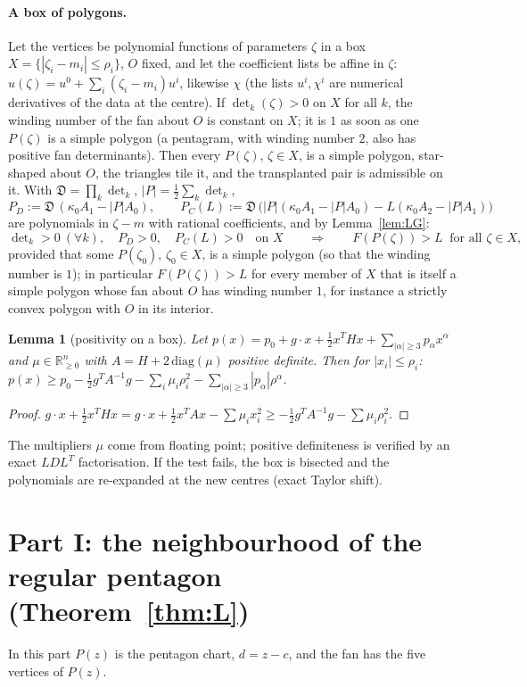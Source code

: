 \documentclass[11pt]{article}
\newtheorem{lemma}[theorem]{Lemma}
\theoremstyle{remark}
\newcommand{\R}{\mathbb{R}}
\newcommand{\D}{\mathfrak{D}}
\begin{document}
\paragraph{A box of polygons.} Let the vertices be polynomial functions of parameters $\zeta$ in a box
$X=\{|\zeta_i-m_i|\le\rho_i\}$, $O$ fixed, and let the coefficient lists be affine in $\zeta$:
$u(\zeta)=u^0+\sum_i(\zeta_i-m_i)u^i$, likewise $\chi$ (the lists $u^i,\chi^i$ are numerical derivatives of the data at
the centre). If $\det_k(\zeta)>0$ on $X$ for all $k$, the winding number of the fan about $O$ is constant on $X$; it is
$1$ as soon as one $P(\zeta)$ is a simple polygon (a pentagram, with winding number $2$, also has positive fan
determinants). Then every $P(\zeta)$, $\zeta\in X$, is a simple polygon, star-shaped about $O$, the triangles tile it, and
the transplanted pair is admissible on it. With $\D=\prod_k\det_k$, $|P|=\frac12\sum_k\det_k$,
\[
P_D:=\D\,(\kappa_0A_1-|P|A_0),\qquad P_C(L):=\D\,\big(|P|(\kappa_0A_1-|P|A_0)-L(\kappa_0A_2-|P|A_1)\big)
\]
are polynomials in $\zeta-m$ with rational coefficients, and by Lemma~\ref{lem:LG}:
\begin{equation}\label{eq:box}
\det\nolimits_k>0\ (\forall k),\quad P_D>0,\quad P_C(L)>0\quad\text{on }X\qquad\Longrightarrow\qquad F(P(\zeta))>L\ \text{ for all }\zeta\in X ,
\end{equation}
provided that some $P(\zeta_0)$, $\zeta_0\in X$, is a simple polygon (so that the winding number is $1$); in
particular $F(P(\zeta))>L$ for every member of $X$ that is itself a simple polygon whose fan about $O$ has winding
number $1$, for instance a strictly convex polygon with $O$ in its interior.
\begin{lemma}[positivity on a box]\label{lem:pos}
Let $p(x)=p_0+g\cdot x+\frac12x^THx+\sum_{|\alpha|\ge3}p_\alpha x^\alpha$ and $\mu\in\R^n_{\ge0}$ with
$A=H+2\,\mathrm{diag}(\mu)$ positive definite. Then for $|x_i|\le\rho_i$:
$p(x)\ge p_0-\frac12g^TA^{-1}g-\sum_i\mu_i\rho_i^2-\sum_{|\alpha|\ge3}|p_\alpha|\rho^\alpha$.
\end{lemma}
\begin{proof}
$g\cdot x+\frac12x^THx=g\cdot x+\frac12x^TAx-\sum\mu_ix_i^2\ge-\frac12g^TA^{-1}g-\sum\mu_i\rho_i^2$.
\end{proof}
The multipliers $\mu$ come from floating point; positive definiteness is verified by an exact $LDL^T$ factorisation.
If the test fails, the box is bisected and the polynomials are re-expanded at the new centres (exact Taylor shift).

\section*{Part I: the neighbourhood of the regular pentagon (Theorem~\ref{thm:L})}
In this part $P(z)$ is the pentagon chart, $d=z-c$, and the fan has the five vertices of $P(z)$.
\end{document}
